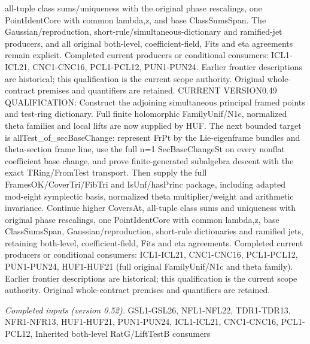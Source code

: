 \documentclass[11pt,a4paper]{article}
\numberwithin{equation}{section}
\theoremstyle{remark}\newtheorem{remark}[theorem]{Remark}
\begin{document}
all-tuple class sums/uniqueness with the original phase rescalings, one PointIdentCore with common lambda,z, and base ClassSumsSpan. The Gaussian/reproduction, short-rule/simultaneous-dictionary and ramified-jet producers, and all original both-level, coefficient-field, Fits and eta agreements remain explicit. Completed current producers or conditional consumers: ICL1-ICL21, CNC1-CNC16, PCL1-PCL12, PUN1-PUN24. Earlier frontier descriptions are historical; this qualification is the current scope authority. Original whole-contract premises and quantifiers are retained. CURRENT VERSION0.49 QUALIFICATION: Construct the adjoining simultaneous principal framed points and test-ring dictionary. Full finite holomorphic FamilyUnif/N1c, normalized theta families and local lifts are now supplied by HUF. The next bounded target is allTest\_\allowbreak of\_\allowbreak secBaseChange: represent FrPt by the Lie-eigenframe bundles and theta-section frame line, use the full n=1 SecBaseChangeSt on every nonflat coefficient base change, and prove finite-generated subalgebra descent with the exact TRing/FromTest transport. Then supply the full FramesOK/CoverTri/FibTri and IsUnf/hasPrinc package, including adapted mod-eight symplectic basis, normalized theta multiplier/weight and arithmetic invariance. Continue higher CoversAt, all-tuple class sums and uniqueness with original phase rescalings, one PointIdentCore with common lambda,z, base ClassSumsSpan, Gaussian/reproduction, short-rule dictionaries and ramified jets, retaining both-level, coefficient-field, Fits and eta agreements. Completed current producers or conditional consumers: ICL1-ICL21, CNC1-CNC16, PCL1-PCL12, PUN1-PUN24, HUF1-HUF21 (full original FamilyUnif/N1c and theta family). Earlier frontier descriptions are historical; this qualification is the current scope authority. Original whole-contract premises and quantifiers are retained.

\emph{Completed inputs (version 0.52).} GSL1-GSL26, NFL1-NFL22, TDR1-TDR13, NFR1-NFR13, HUF1-HUF21, PUN1-PUN24, ICL1-ICL21, CNC1-CNC16, PCL1-PCL12, Inherited both-level RatG/LiftTestB consumers
\end{document}
